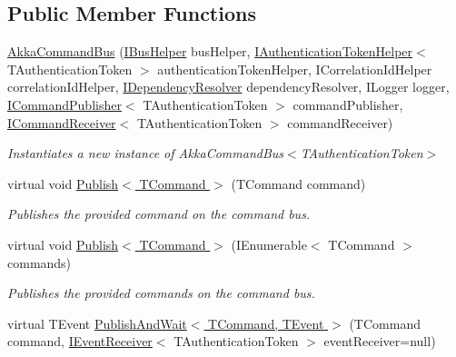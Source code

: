 \subsection*{Public Member Functions}
\begin{DoxyCompactItemize}
\item 
\hyperlink{classCqrs_1_1Akka_1_1Commands_1_1AkkaCommandBus_a255b78be5cb216dcd30e2d2dd1240c06_a255b78be5cb216dcd30e2d2dd1240c06}{Akka\+Command\+Bus} (\hyperlink{interfaceCqrs_1_1Bus_1_1IBusHelper}{I\+Bus\+Helper} bus\+Helper, \hyperlink{interfaceCqrs_1_1Authentication_1_1IAuthenticationTokenHelper}{I\+Authentication\+Token\+Helper}$<$ T\+Authentication\+Token $>$ authentication\+Token\+Helper, I\+Correlation\+Id\+Helper correlation\+Id\+Helper, \hyperlink{interfaceCqrs_1_1Configuration_1_1IDependencyResolver}{I\+Dependency\+Resolver} dependency\+Resolver, I\+Logger logger, \hyperlink{interfaceCqrs_1_1Commands_1_1ICommandPublisher}{I\+Command\+Publisher}$<$ T\+Authentication\+Token $>$ command\+Publisher, \hyperlink{interfaceCqrs_1_1Commands_1_1ICommandReceiver}{I\+Command\+Receiver}$<$ T\+Authentication\+Token $>$ command\+Receiver)
\begin{DoxyCompactList}\small\item\em Instantiates a new instance of Akka\+Command\+Bus$<$\+T\+Authentication\+Token$>$ \end{DoxyCompactList}\item 
virtual void \hyperlink{classCqrs_1_1Akka_1_1Commands_1_1AkkaCommandBus_a48e1d46035b1e1a3251636b8a03f7dae_a48e1d46035b1e1a3251636b8a03f7dae}{Publish$<$ T\+Command $>$} (T\+Command command)
\begin{DoxyCompactList}\small\item\em Publishes the provided {\itshape command}  on the command bus. \end{DoxyCompactList}\item 
virtual void \hyperlink{classCqrs_1_1Akka_1_1Commands_1_1AkkaCommandBus_ab52365375febd74ac078e97af6e6cd24_ab52365375febd74ac078e97af6e6cd24}{Publish$<$ T\+Command $>$} (I\+Enumerable$<$ T\+Command $>$ commands)
\begin{DoxyCompactList}\small\item\em Publishes the provided {\itshape commands}  on the command bus. \end{DoxyCompactList}\item 
virtual T\+Event \hyperlink{classCqrs_1_1Akka_1_1Commands_1_1AkkaCommandBus_a8e1291f0259ac80e393c02bb119159a5_a8e1291f0259ac80e393c02bb119159a5}{Publish\+And\+Wait$<$ T\+Command, T\+Event $>$} (T\+Command command, \hyperlink{interfaceCqrs_1_1Events_1_1IEventReceiver}{I\+Event\+Receiver}$<$ T\+Authentication\+Token $>$ event\+Receiver=null)

\end{DoxyCompactItemize}
